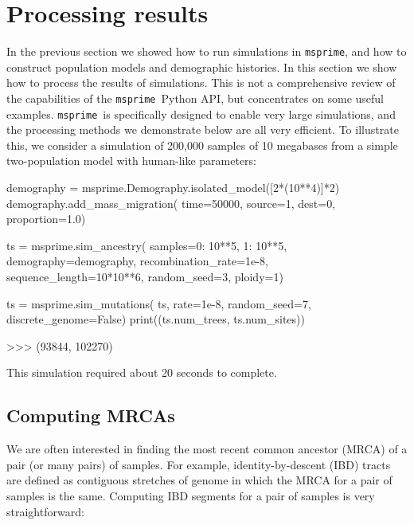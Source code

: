 \documentclass[graybox]{svmult}
\newcommand{\msprime}[0]{\texttt{msprime}}
\begin{document}

\section{Processing results}\label{processing-results}

In the previous section we showed how to run simulations in \msprime, and
how to construct population models and demographic histories. In this
section we show how to process the results of simulations. This is not a
comprehensive review of the capabilities of the \msprime\ Python API, but
concentrates on some useful examples.
\msprime\ is specifically designed to enable very large simulations, and
the processing methods we demonstrate below are all very efficient. To
illustrate this, we consider a simulation of 200,000 samples of 10 megabases
from a simple two-population model with human-like parameters:

\begin{pythoncode}
demography = msprime.Demography.isolated_model([2*(10**4)]*2)
demography.add_mass_migration(
    time=50000, source=1, dest=0, proportion=1.0)

ts = msprime.sim_ancestry(
    samples={0: 10**5, 1: 10**5},
    demography=demography, recombination_rate=1e-8,
    sequence_length=10*10**6, random_seed=3, ploidy=1)

ts = msprime.sim_mutations(
    ts, rate=1e-8, random_seed=7, discrete_genome=False)
print((ts.num_trees, ts.num_sites))

>>> (93844, 102270)
\end{pythoncode}

This simulation required about 20 seconds to complete.


\subsection{Computing MRCAs}\label{computing-mrcas}

We are often interested in finding the most recent common ancestor (MRCA)
of a pair (or many pairs) of samples. For example, identity-by-descent
(IBD) tracts are defined as contiguous stretches of genome in which the
MRCA for a pair of samples is the same. Computing IBD segments for a
pair of samples is very straightforward:
\end{document}
